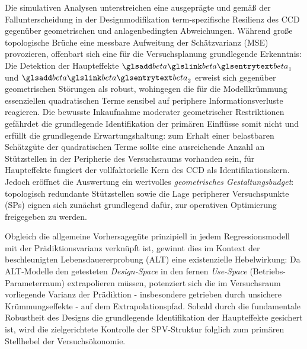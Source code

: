 Die simulativen Analysen unterstreichen eine ausgeprägte und gemäß der Fallunterscheidung in der Designmodifikation term-spezifische Resilienz des \ac{CCD} gegenüber geometrischen und anlagenbedingten Abweichungen.
Während große topologische Brüche eine messbare Aufweitung der Schätzvarianz (\ac{MSE}) provozieren, offenbart sich eine für die Versuchsplanung grundlegende Erkenntnis:
Die Detektion der Haupteffekte $\sym{beta}_1$ und $\sym{beta}_2$ erweist sich gegenüber geometrischen Störungen als robust, wohingegen die für die Modellkrümmung essenziellen quadratischen Terme sensibel auf periphere Informationsverluste reagieren.
Die bewusste Inkaufnahme moderater geometrischer Restriktionen gefährdet die grundlegende Identifikation der primären Einflüsse somit nicht und erfüllt die grundlegende Erwartungshaltung: zum Erhalt einer belastbaren Schätzgüte der quadratischen Terme sollte eine ausreichende Anzahl an Stützstellen in der Peripherie des Versuchsraums vorhanden sein, für Haupteffekte fungiert der vollfaktorielle Kern des \ac{CCD} als Identifikationskern.
Jedoch eröffnet die Auswertung ein wertvolles \textit{geometrisches Gestaltungsbudget}: topologisch redundante Stützstellen sowie die Lage peripherer Versuchspunkte (\acp{SP}) eignen sich zunächst grundlegend dafür, zur operativen Optimierung freigegeben zu werden.

Obgleich die allgemeine Vorhersagegüte prinzipiell in jedem Regressionsmodell mit der Prädiktionsvarianz verknüpft ist, gewinnt dies im Kontext der beschleunigten Lebensdauererprobung (\ac{ALT}) eine existenzielle Hebelwirkung:
Da \ac{ALT}-Modelle den getesteten \textit{Design-Space} in den fernen \textit{Use-Space} (Betriebs-Parameterraum) extrapolieren müssen, potenziert sich die im Versuchsraum vorliegende Varianz der Prädiktion - insbesondere getrieben durch unsichere Krümmungseffekte - auf dem Extrapolationspfad.
Sobald durch die fundamentale Robustheit des Designs die grundlegende Identifikation der Haupteffekte gesichert ist, wird die zielgerichtete Kontrolle der \ac{SPV}-Struktur folglich zum primären Stellhebel der Versuchsökonomie.

